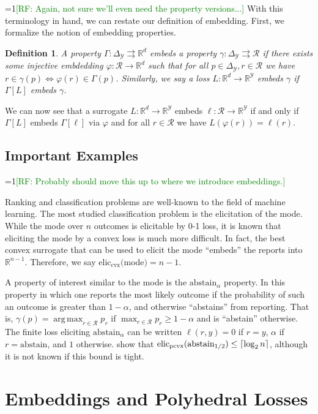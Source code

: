 \documentclass[12pt]{article}
\newcommand{\Comments}{1}
\newcommand{\mynote}[2]{\ifnum\Comments=1\textcolor{#1}{#2}\fi}
\newcommand{\raf}[1]{\mynote{green}{[RF: #1]}}
\newcommand{\reals}{\mathbb{R}}
\newcommand{\prop}[1]{\Gamma[#1]}
\newcommand{\eliccvx}{\mathrm{elic}_\mathrm{cvx}}
\newcommand{\elicpoly}{\mathrm{elic}_\mathrm{pcvx}}
\newcommand{\abstain}[1]{\mathrm{abstain}_{#1}}
\newcommand{\simplex}{\Delta_\Y}
\newcommand{\R}{\mathcal{R}}
\newcommand{\Y}{\mathcal{Y}}
\newcommand{\toto}{\rightrightarrows}
\DeclarePairedDelimiter\ceil{\lceil}{\rceil}
\DeclareMathOperator*{\argmax}{arg\,max}
\newtheorem{definition}{Definition}
\begin{document}
\raf{Again, not sure we'll even need the property versions...}
With this terminology in hand, we can restate our definition of embedding.
First, we formalize the notion of embedding properties.
\begin{definition}
  A property $\Gamma : \simplex \toto \reals^d$ \emph{embeds} a property $\gamma : \simplex \toto \R$ if there exists some injective embdedding $\varphi:\R\to\reals^d$ such that for all $p\in\simplex,r\in\R$ we have $r \in \gamma(p) \iff \varphi(r) \in \Gamma(p)$.
  Similarly, we say a loss $L:\reals^d\to\reals^\Y$ embeds $\gamma$ if $\prop{L}$ embeds $\gamma$.
\end{definition}
We can now see that a surrogate $L:\reals^d\to\reals^\Y$ embeds $\ell:\R\to\reals^\Y$ if and only if $\prop{L}$ embeds $\prop{\ell}$ via $\varphi$ and for all $r\in\R$ we have $L(\varphi(r)) = \ell(r)$.


\subsection{Important Examples}\label{sec:important-examples}
\raf{Probably should move this up to where we introduce embeddings.}

  Ranking and classification problems are well-known to the field of machine learning.
  The most studied classification problem is the elicitation of the mode.
  While the mode over $n$ outcomes is elicitable by 0-1 loss, it is known that eliciting the mode by a convex loss is much more difficult.
  In fact, the best convex surrogate that can be used to elicit the mode ``embeds'' the reports into $\reals^{n-1}$.
  Therefore, we say $\eliccvx($mode$) = n-1$.

  A property of interest similar to the mode is the $\abstain{\alpha}$ property.
  In this property in which one reports the most likely outcome if the probability of such an outcome is greater than $1-\alpha$, and otherwise ``abstains'' from reporting.
  That is, $\gamma(p) = \argmax_{r \in \R}p_r$ if $\max_{r \in \R} p_r \geq 1-\alpha$ and is ``abstain'' otherwise.
  The finite loss eliciting $\abstain{\alpha}$ can be written
  $\ell(r,y) = 0$ if $r=y$, $\alpha$ if $r=\text{abstain}$, and $1$ otherwise.
\cite{ramaswamy2018consistent} show that $\elicpoly(\abstain{1/2}) \leq \ceil{\log_2 n}$, although it is not known if this bound is tight.


\section{Embeddings and Polyhedral Losses}
\label{sec:poly-loss-embed}
\end{document}
